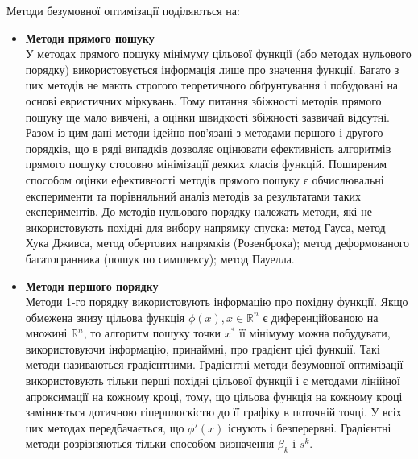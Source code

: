 Методи безумовної оптимізації поділяються на:
\begin{itemize}
	\item \textbf{Методи прямого пошуку}\\
	У методах прямого пошуку мінімуму цільової функції (або методах нульового порядку) використовується інформація лише про значення функції. Багато з цих методів не мають строгого теоретичного обґрунтування і побудовані на основі евристичних міркувань. Тому питання збіжності методів прямого пошуку ще мало вивчені, а оцінки швидкості збіжності зазвичай відсутні. Разом із цим дані методи ідейно пов'язані з методами першого і другого порядків, що в ряді випадків дозволяє оцінювати ефективність алгоритмів прямого пошуку стосовно мінімізації деяких класів функцій. Поширеним способом оцінки ефективності методів прямого пошуку є обчислювальні експерименти та порівняльний аналіз методів за результатами таких експериментів.
	 До методів нульового порядку належать методи, які не використовують похідні для вибору напрямку спуска: метод Гауса, метод Хука Дживса, метод обертових напрямків (Розенброка); метод деформованого багатогранника (пошук по симплексу); метод Пауелла.
	\item \textbf{Методи першого порядку}\\
	Методи 1-го порядку використовують інформацію про похідну функції. Якщо обмежена знизу цільова функція $\phi(x), x \in \mathbb{R}^n$ є диференційованою на множині $\mathbb{R}^n$, то алгоритм пошуку точки $x^*$ її мінімуму можна побудувати, використовуючи інформацію, принаймні, про градієнт цієї функції. Такі методи називаються градієнтними. Градієнтні методи безумовної оптимізації використовують тільки перші похідні цільової функції і є методами лінійної апроксимації на кожному кроці, тому, що цільова функція на кожному кроці замінюється дотичною гіперплоскістю до її графіку в поточній точці.
	У всіх цих методах передбачається, що $\phi'(x)$ існують і безперервні. Градієнтні методи розрізняються тільки способом визначення $\beta_k$ і $s^k$. 
	

\end{itemize}
